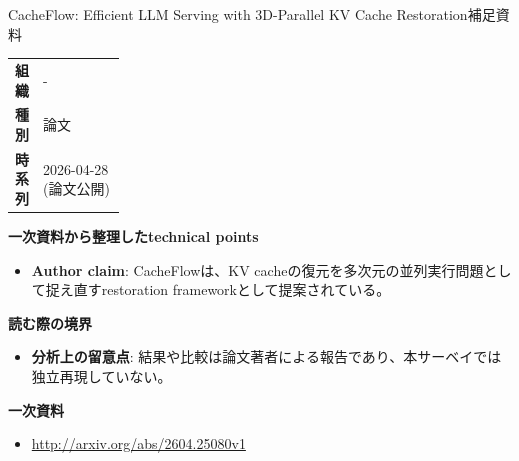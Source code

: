 \begin{technicalnote}{CacheFlow: Efficient LLM Serving with 3D-Parallel KV Cache Restoration}{補足資料}
\begingroup
\begin{tabularx}{\linewidth}{@{}>{\bfseries}p{0.22\linewidth}X@{}}
組織 & - \\
種別 & 論文 \\
時系列 & 2026-04-28 (論文公開) \\
\end{tabularx}
\smallskip
{\bfseries 一次資料から整理したtechnical points}
\begin{itemize}[leftmargin=1.5em,itemsep=0.35em]
\item \textbf{Author claim}: CacheFlowは、KV cacheの復元を多次元の並列実行問題として捉え直すrestoration frameworkとして提案されている。
\end{itemize}
{\bfseries 読む際の境界}
\begin{itemize}[leftmargin=1.5em,itemsep=0.35em]
\item \textbf{分析上の留意点}: 結果や比較は論文著者による報告であり、本サーベイでは独立再現していない。
\end{itemize}
\begin{samepage}
{\bfseries 一次資料}
\begingroup\sloppy
\begin{itemize}[leftmargin=1.5em,itemsep=0.25em]
\item {\scriptsize\url{http://arxiv.org/abs/2604.25080v1}}
\end{itemize}
\endgroup
\end{samepage}
\endgroup
\end{technicalnote}
\medskip

